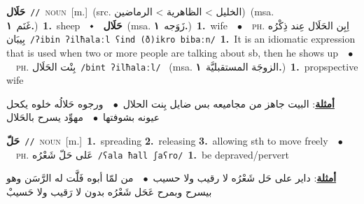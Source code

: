 \documentclass[10pt,a4paper,twoside]{article} %
\begin{document}
\begin{multicols}{2}
{\setlength\topsep{0pt}\textbf{\foreignlanguage{arabic}{حَلَال}}\ {\color{gray}\texttt{//}\color{black}}\ \textsc{noun}\ [m.]\ (src. \color{gray}\foreignlanguage{arabic}{الخليل > الظاهرية > الرماضين}\color{black})\ \color{gray}(msa. \foreignlanguage{arabic}{غَنَم}~\foreignlanguage{arabic}{\textbf{١.}})\color{black}\ \textbf{1.}~sheep\ \ $\smblkdiamond$\ \ \setlength\topsep{0pt}\textbf{\foreignlanguage{arabic}{حَلَال}}\ \color{gray}(msa. \foreignlanguage{arabic}{زَوَجه}~\foreignlanguage{arabic}{\textbf{١.}})\color{black}\ \textbf{1.}~wife\ \ $\bullet$\ \ \textsc{ph.} \color{gray} \foreignlanguage{arabic}{اِبِن الحَلَال عِند ذِكْرُه بِيبَان}\color{black}\ {\color{gray}\texttt{/{\sffamily ʔibin ʔilħalaːl ʕind (ð)ikro bibaːn}/}\color{black}}\ \textbf{1.}~It is an idiomatic expression that is used when two or more people are talking about sb, then he shows up\ \ $\bullet$\ \ \textsc{ph.} \color{gray} \foreignlanguage{arabic}{بِنْت الحَلَال}\color{black}\ {\color{gray}\texttt{/{\sffamily bint ʔilħalaːl}/}\color{black}}\ \color{gray} (msa. \foreignlanguage{arabic}{الزوجَة المستقبليَّة}~\foreignlanguage{arabic}{\textbf{١.}})\color{black}\ \textbf{1.}~propspective wife\  \begin{flushright}\color{gray}\foreignlanguage{arabic}{\textbf{\underline{\foreignlanguage{arabic}{أمثلة}}}: البيت جاهز من مجاميعه بس ضايل بِنت الحلال\ $\bullet$\ \  ورجوه حَلالُه خلوه يكحل عيونه بشوفتها\ $\bullet$\ \  مهوِّد يسرح بالحَلال}\end{flushright}\color{black}} \vspace{2mm}

{\setlength\topsep{0pt}\textbf{\foreignlanguage{arabic}{حَلّ}}\ {\color{gray}\texttt{//}\color{black}}\ \textsc{noun}\ [m.]\ \textbf{1.}~spreading  \textbf{2.}~releasing  \textbf{3.}~allowing sth to move freely\ \ $\bullet$\ \ \textsc{ph.} \color{gray} \foreignlanguage{arabic}{عَلى حَلّ شَعْرُه}\color{black}\ {\color{gray}\texttt{/{\sffamily ʕala ħall ʃaʕro}/}\color{black}}\ \textbf{1.}~be depraved/pervert\  \begin{flushright}\color{gray}\foreignlanguage{arabic}{\textbf{\underline{\foreignlanguage{arabic}{أمثلة}}}: داير على حَل شَعْرُه لا رقيب ولا حسيب\ $\bullet$\ \  من لمّا أبوه فَلََّت له الرَّسَن وهو بيسرح وبمرح عَحَل شَعْرُه بدون لا رَقيب ولا حَسيبْ}\end{flushright}\color{black}} \vspace{2mm}


\end{multicols}
\end{document}
